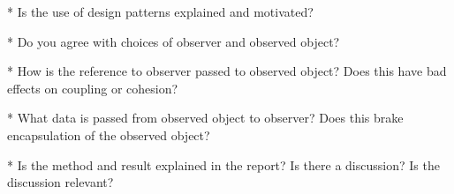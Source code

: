 \documentclass[a4paper]{scrreprt}
\begin{document}
* Is the use of design patterns explained and motivated?

* Do you agree with choices of observer and observed object?

* How is the reference to observer passed to observed object? Does this have bad
effects on coupling or cohesion?

* What data is passed from observed object to observer? Does this brake encapsulation of the observed object?

* Is the method and result explained in the report? Is there a discussion? Is the
discussion relevant?


\listoflistings %
\printbibliography
\end{document}
